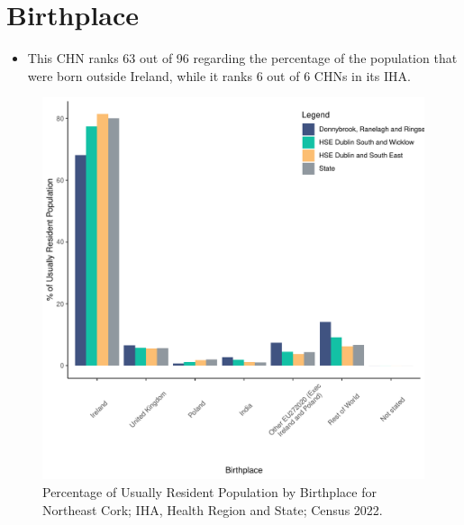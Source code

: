 \documentclass{article}
\begin{document}
\section{Birthplace}\label{sect:Birth}
\begin{itemize}
\item This CHN ranks  63 out of 96 regarding the percentage of the population that were born outside Ireland, while it ranks  6 out of 6 CHNs in its IHA.
\end{itemize}
\begin{figure}[H]
	\centering
	\includegraphics[width = 130mm]{../figures/BirthED.pdf}
	\caption{Percentage of Usually Resident Population by Birthplace for Northeast Cork; IHA, Health Region and State; Census 2022.}
	\label{fig:vbnv}
	\end{figure}
	
\end{document}
